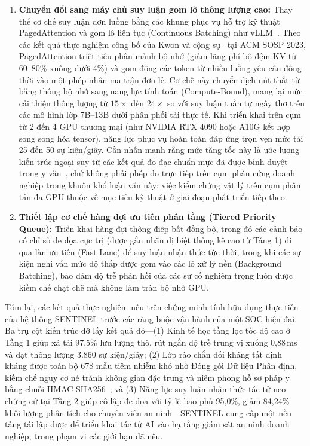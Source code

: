 \begin{enumerate}[leftmargin=*,noitemsep]
    \item \textbf{Chuyển đổi sang máy chủ suy luận gom lô thông lượng cao:} Thay thế cơ chế suy luận đơn luồng bằng các khung phục vụ hỗ trợ kỹ thuật PagedAttention và gom lô liên tục (Continuous Batching) như vLLM~\cite{kwon2023vllm}. Theo các kết quả thực nghiệm công bố của Kwon và cộng sự~\cite{kwon2023vllm} tại ACM SOSP 2023, PagedAttention triệt tiêu phân mảnh bộ nhớ (giảm lãng phí bộ đệm KV từ 60--80\% xuống dưới 4\%) và gom động các token từ nhiều luồng yêu cầu đồng thời vào một phép nhân ma trận đơn lẻ. Cơ chế này chuyển dịch nút thắt từ băng thông bộ nhớ sang năng lực tính toán (Compute-Bound), mang lại mức cải thiện thông lượng từ $15\times$ đến $24\times$ so với suy luận tuần tự ngây thơ trên các mô hình lớp 7B--13B dưới phân phối tải thực tế. Khi triển khai trên cụm từ 2 đến 4 GPU thương mại (như NVIDIA RTX 4090 hoặc A10G kết hợp song song hóa tensor), năng lực phục vụ hoàn toàn đáp ứng trọn vẹn mức tải 25 đến 50 sự kiện/giây. Cần nhấn mạnh rằng mức tăng tốc này là ước lượng kiến trúc ngoại suy từ các kết quả đo đạc chuẩn mực đã được bình duyệt trong y văn~\cite{kwon2023vllm}, chứ không phải phép đo trực tiếp trên cụm phần cứng doanh nghiệp trong khuôn khổ luận văn này; việc kiểm chứng vật lý trên cụm phân tán đa GPU thuộc về mục tiêu kỹ thuật ở giai đoạn phát triển tiếp theo.
    \item \textbf{Thiết lập cơ chế hàng đợi ưu tiên phân tầng (Tiered Priority Queue):} Triển khai hàng đợi thông điệp bất đồng bộ, trong đó các cảnh báo có chỉ số đe dọa cực trị (được gắn nhãn dị biệt thống kê cao từ Tầng 1) đi qua làn ưu tiên (Fast Lane) để suy luận nhận thức tức thời, trong khi các sự kiện nghi vấn mức độ thấp được gom vào các lô xử lý nền (Background Batching), bảo đảm độ trễ phản hồi của các sự cố nghiêm trọng luôn được kiềm chế chặt chẽ mà không làm tràn bộ nhớ GPU.
\end{enumerate}

Tóm lại, các kết quả thực nghiệm nêu trên chứng minh tính hữu dụng thực tiễn của hệ thống SENTINEL trước các ràng buộc vận hành của một SOC hiện đại. Ba trụ cột kiến trúc đỡ lấy kết quả đó---(1) Kinh tế học tầng lọc tốc độ cao ở Tầng 1 giúp xả tải 97,5\% lưu lượng thô, rút ngắn độ trễ trung vị xuống 0,88\,ms và đạt thông lượng 3.860 sự kiện/giây; (2) Lớp rào chắn đối kháng tất định kháng được toàn bộ 678 mẫu tiêm nhiễm khó nhờ Đóng gói Dữ liệu Phân định, kiềm chế nguy cơ né tránh không gian đặc trưng và niêm phong hồ sơ pháp y bằng chuỗi HMAC-SHA256~\cite{hmac1997}; và (3) Năng lực suy luận nhận thức tác tử neo chứng cứ tại Tầng 2 giúp cô lập đe dọa với tỷ lệ bao phủ 95,0\%, giảm 84,24\% khối lượng phân tích cho chuyên viên an ninh---SENTINEL cung cấp một nền tảng tái lập được để triển khai tác tử AI vào hạ tầng giám sát an ninh doanh nghiệp, trong phạm vi các giới hạn đã nêu.

